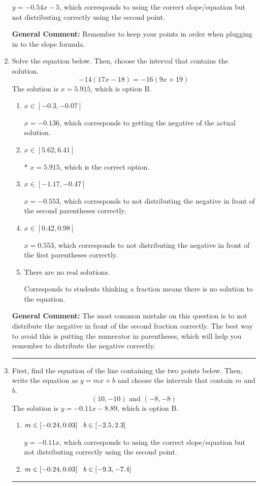 \documentclass{extbook}[14pt]
\newcommand{\litem}[1]{\item #1

\rule{\textwidth}{0.4pt}}
\begin{document}
\begin{enumerate}
{\begin{enumerate}[label=\Alph*.]
 $y = -0.54x -5$, which corresponds to using the correct slope/equation but not distributing correctly using the second point.
\end{enumerate}

\textbf{General Comment:} Remember to keep your points in order when plugging in to the slope formula.
}
\litem{
Solve the equation below. Then, choose the interval that contains the solution.
\[ -14(17x -18) = -16(9x + 19) \]
The solution is \( x = 5.915 \), which is option B.\begin{enumerate}[label=\Alph*.]
\item \( x \in [-0.3, -0.07] \)

$x = -0.136$, which corresponds to getting the negative of the actual solution.
\item \( x \in [5.62, 6.41] \)

* $x = 5.915$, which is the correct option.
\item \( x \in [-1.17, -0.47] \)

$x = -0.553$, which corresponds to not distributing the negative in front of the second parentheses correctly.
\item \( x \in [0.42, 0.98] \)

$x = 0.553$, which corresponds to not distributing the negative in front of the first parentheses correctly.
\item \( \text{There are no real solutions.} \)

Corresponds to students thinking a fraction means there is no solution to the equation.
\end{enumerate}

\textbf{General Comment:} The most common mistake on this question is to not distribute the negative in front of the second fraction correctly. The best way to avoid this is putting the numerator in parentheses, which will help you remember to distribute the negative correctly.
}
\litem{
First, find the equation of the line containing the two points below. Then, write the equation as $ y=mx+b $ and choose the intervals that contain $m$ and $b$.
\[ (10, -10) \text{ and } (-8, -8) \]
The solution is \( y = -0.11x -8.89 \), which is option B.\begin{enumerate}[label=\Alph*.]
\item \( m \in [-0.24, 0.03] \hspace*{3mm} b \in [-2.5, 2.3] \)

 $y = -0.11x$, which corresponds to using the correct slope/equation but not distributing correctly using the second point.
\item \( m \in [-0.24, 0.03] \hspace*{3mm} b \in [-9.3, -7.4] \)


\end{enumerate}}
\end{enumerate}
\end{document}
